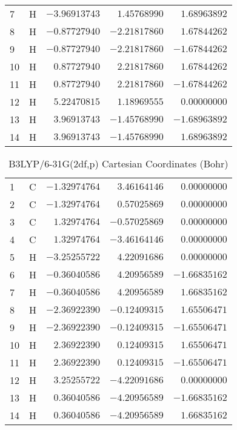 \documentclass[10pt,oneside]{article}
\begin{document}
\begin{table}[h!]
\begin{multicols}{2}
\begin{tabular}{llrrr}
7  & H  & $-3.96913743$ & $ 1.45768990$ & $ 1.68963892$ \\
8  & H  & $-0.87727940$ & $-2.21817860$ & $ 1.67844262$ \\
9  & H  & $-0.87727940$ & $-2.21817860$ & $-1.67844262$ \\
10 & H  & $ 0.87727940$ & $ 2.21817860$ & $ 1.67844262$ \\
11 & H  & $ 0.87727940$ & $ 2.21817860$ & $-1.67844262$ \\
12 & H  & $ 5.22470815$ & $ 1.18969555$ & $ 0.00000000$ \\
13 & H  & $ 3.96913743$ & $-1.45768990$ & $-1.68963892$ \\
14 & H  & $ 3.96913743$ & $-1.45768990$ & $ 1.68963892$ \\
\bottomrule
\end{tabular}
\end{multicols}
\end{table}

\begin{table}[h]
\centering
\caption{B3LYP/6-31G(2df,p) Cartesian Coordinates (Bohr)}
\begin{tabular}{llrrr}
\toprule
1  & C  & $-1.32974764$ & $ 3.46164146$ & $ 0.00000000$ \\
2  & C  & $-1.32974764$ & $ 0.57025869$ & $ 0.00000000$ \\
3  & C  & $ 1.32974764$ & $-0.57025869$ & $ 0.00000000$ \\
4  & C  & $ 1.32974764$ & $-3.46164146$ & $ 0.00000000$ \\
5  & H  & $-3.25255722$ & $ 4.22091686$ & $ 0.00000000$ \\
6  & H  & $-0.36040586$ & $ 4.20956589$ & $-1.66835162$ \\
7  & H  & $-0.36040586$ & $ 4.20956589$ & $ 1.66835162$ \\
8  & H  & $-2.36922390$ & $-0.12409315$ & $ 1.65506471$ \\
9  & H  & $-2.36922390$ & $-0.12409315$ & $-1.65506471$ \\
10 & H  & $ 2.36922390$ & $ 0.12409315$ & $ 1.65506471$ \\
11 & H  & $ 2.36922390$ & $ 0.12409315$ & $-1.65506471$ \\
12 & H  & $ 3.25255722$ & $-4.22091686$ & $ 0.00000000$ \\
13 & H  & $ 0.36040586$ & $-4.20956589$ & $-1.66835162$ \\
14 & H  & $ 0.36040586$ & $-4.20956589$ & $ 1.66835162$ \\
\bottomrule
\end{tabular}
\end{table}
\end{document}
